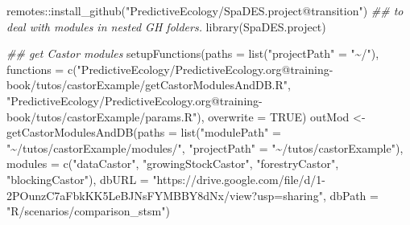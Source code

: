 \documentclass[
  letterpaper,
  DIV=11,
  numbers=noendperiod]{scrreprt}
\newenvironment{Shaded}{\begin{snugshade}}{\end{snugshade}}
\newcommand{\AttributeTok}[1]{\textcolor[rgb]{0.40,0.45,0.13}{#1}}
\newcommand{\ConstantTok}[1]{\textcolor[rgb]{0.56,0.35,0.01}{#1}}
\newcommand{\DocumentationTok}[1]{\textcolor[rgb]{0.37,0.37,0.37}{\textit{#1}}}
\newcommand{\FunctionTok}[1]{\textcolor[rgb]{0.28,0.35,0.67}{#1}}
\newcommand{\NormalTok}[1]{\textcolor[rgb]{0.00,0.23,0.31}{#1}}
\newcommand{\OtherTok}[1]{\textcolor[rgb]{0.00,0.23,0.31}{#1}}
\newcommand{\SpecialCharTok}[1]{\textcolor[rgb]{0.37,0.37,0.37}{#1}}
\newcommand{\StringTok}[1]{\textcolor[rgb]{0.13,0.47,0.30}{#1}}
\begin{document}
\begin{Shaded}
\begin{Highlighting}[]
\NormalTok{remotes}\SpecialCharTok{::}\FunctionTok{install\_github}\NormalTok{(}\StringTok{"PredictiveEcology/SpaDES.project@transition"}\NormalTok{)   }\DocumentationTok{\#\# to deal with modules in nested GH folders.}
\FunctionTok{library}\NormalTok{(SpaDES.project)}

\DocumentationTok{\#\# get Castor modules}
\FunctionTok{setupFunctions}\NormalTok{(}\AttributeTok{paths =} \FunctionTok{list}\NormalTok{(}\StringTok{"projectPath"} \OtherTok{=} \StringTok{"\textasciitilde{}/"}\NormalTok{),}
               \AttributeTok{functions =} \FunctionTok{c}\NormalTok{(}\StringTok{"PredictiveEcology/PredictiveEcology.org@training{-}book/tutos/castorExample/getCastorModulesAndDB.R"}\NormalTok{,}
                             \StringTok{"PredictiveEcology/PredictiveEcology.org@training{-}book/tutos/castorExample/params.R"}\NormalTok{),}
               \AttributeTok{overwrite =} \ConstantTok{TRUE}\NormalTok{)}
\NormalTok{outMod }\OtherTok{\textless{}{-}} \FunctionTok{getCastorModulesAndDB}\NormalTok{(}\AttributeTok{paths =} \FunctionTok{list}\NormalTok{(}\StringTok{"modulePath"} \OtherTok{=} \StringTok{"\textasciitilde{}/tutos/castorExample/modules/"}\NormalTok{,}
                                             \StringTok{"projectPath"} \OtherTok{=} \StringTok{"\textasciitilde{}/tutos/castorExample"}\NormalTok{),}
                                \AttributeTok{modules =} \FunctionTok{c}\NormalTok{(}\StringTok{"dataCastor"}\NormalTok{, }
                                            \StringTok{"growingStockCastor"}\NormalTok{, }
                                            \StringTok{"forestryCastor"}\NormalTok{, }
                                            \StringTok{"blockingCastor"}\NormalTok{),}
                                \AttributeTok{dbURL =} \StringTok{"https://drive.google.com/file/d/1{-}2POunzC7aFbkKK5LeBJNsFYMBBY8dNx/view?usp=sharing"}\NormalTok{,}
                                \AttributeTok{dbPath =} \StringTok{"R/scenarios/comparison\_stsm"}\NormalTok{)}


\end{Highlighting}
\end{Shaded}
\end{document}
